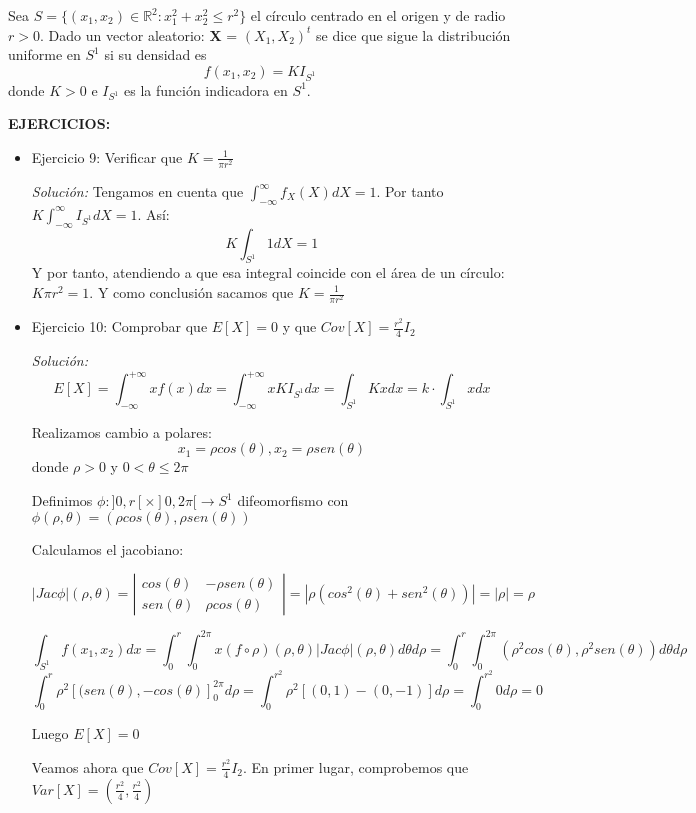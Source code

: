 \documentclass{article}
\theoremstyle{theorem-style}  %
\theoremstyle{definition}
\theoremstyle{example-style}
\begin{document}
	Sea $S=\{(x_1, x_2) \in \mathbb{R}^2: x_1^2+x_2^2 \leq r^2\}$ el círculo centrado en el origen y de radio $r>0$. Dado un vector aleatorio: \textbf{X} = $(X_1, X_2)^t$ se dice que sigue la distribución uniforme en $S^1$ si su densidad es $$f(x_1,x_2) = KI_{S^1}$$ donde $K>0$ e $I_{S^1}$ es la función indicadora en $S^1$.
	
	\textbf{EJERCICIOS:}
	
	\begin{itemize}
		\item Ejercicio 9: Verificar que $K=\frac{1}{\pi r^2}$
		
		\textit{Solución:} Tengamos en cuenta que $\int_{-\infty}^{\infty} f_X(X) dX = 1$. Por tanto $K \int_{-\infty}^{\infty} I_{S^1} dX =1 $. Así: $$K \int_{S^1}^{}1dX = 1 $$ Y por tanto, atendiendo a que esa integral coincide con el área de un círculo: $K\pi r^2 = 1$. Y como conclusión sacamos que $K=\frac{1}{\pi r^2}$
		
		\item Ejercicio 10: Comprobar que $E[X]=0$ y que $Cov[X] = \frac{r^2}{4}I_2$
		
		\textit{Solución:}
		$$E[X]=\int_{-\infty}^{+\infty}xf(x) dx = \int_{-\infty}^{+\infty}xKI_{S^1} dx = \int_{S^1}Kx dx = k \cdot \int_{S^1}x dx$$ 
		
		Realizamos cambio a polares:
		 $$x_1 = \rho cos(\theta), x_2 = \rho sen(\theta)$$
		donde $\rho>0$ y $0<\theta\leq2\pi$
		
		Definimos $\phi:]0,r[\times]0,2\pi[\longrightarrow S^1$ difeomorfismo con $\phi(\rho,\theta) = (\rho cos(\theta), \rho sen(\theta))$
		
		Calculamos el jacobiano:
		
		$$|Jac \phi|(\rho,\theta) = \left| \begin{array}{cc}
		cos(\theta) & -\rho sen(\theta) \\
		sen(\theta) & \rho cos(\theta)  \end{array} \right| = |\rho(cos^2(\theta)+sen^2(\theta))| = |\rho| = \rho$$
		
		$$\int_{S^1}f(x_1,x_2) dx = \int_{0}^{r}\int_{0}^{2\pi}x(f\circ \rho)(\rho,\theta)|Jac \phi|(\rho,\theta)d\theta d\rho = \int_{0}^{r}\int_{0}^{2\pi}(\rho^2cos(\theta),\rho^2sen(\theta))d\theta d\rho$$
		$$ \int_{0}^{r}\rho^2\left[(sen(\theta),-cos(\theta)\right]_0^{2\pi} d\rho = \int_0^{r^2}\rho^2\left[(0,1)-(0,-1)\right]d\rho = \int_0^{r^2}0d\rho = 0$$		
		
		Luego $E[X]=0$
		
		Veamos ahora que $Cov[X] = \frac{r^2}{4}I_2$. En primer lugar, comprobemos que $Var[X]=\left(\frac{r^2}{4},\frac{r^2}{4}\right)$
		

\end{itemize}
\end{document}
